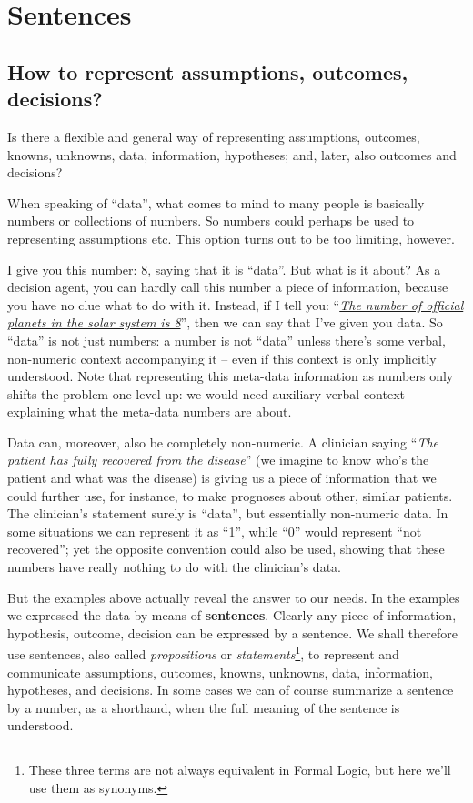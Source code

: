 \documentclass[
  a4paper,
  DIV=11,
  numbers=noendperiod,
  oneside]{scrreprt}
\begin{document}
\hypertarget{sentences}{%
\section{Sentences}\label{sentences}}

\hypertarget{how-to-represent-assumptions-outcomes-decisions}{%
\subsection{How to represent assumptions, outcomes,
decisions?}\label{how-to-represent-assumptions-outcomes-decisions}}

Is there a flexible and general way of representing assumptions,
outcomes, knowns, unknowns, data, information, hypotheses; and, later,
also outcomes and decisions?

When speaking of ``data'', what comes to mind to many people is
basically numbers or collections of numbers. So numbers could perhaps be
used to representing assumptions etc. This option turns out to be too
limiting, however.

I give you this number: {\(8\),} saying that it is ``data''. But what is
it about? As a decision agent, you can hardly call this number a piece
of information, because you have no clue what to do with it. Instead, if
I tell you:
``\emph{\href{https://solarsystem.nasa.gov/planets/overview}{The number
of official planets in the solar system is 8}}'', then we can say that
I've given you data. So ``data'' is not just numbers: a number is not
``data'' unless there's some verbal, non-numeric context accompanying it
-- even if this context is only implicitly understood. Note that
representing this meta-data information as numbers only shifts the
problem one level up: we would need auxiliary verbal context explaining
what the meta-data numbers are about.

Data can, moreover, also be completely non-numeric. A clinician saying
``\emph{The patient has fully recovered from the disease}'' (we imagine
to know who's the patient and what was the disease) is giving us a piece
of information that we could further use, for instance, to make
prognoses about other, similar patients. The clinician's statement
surely is ``data'', but essentially non-numeric data. In some situations
we can represent it as ``1'', while ``0'' would represent ``not
recovered''; yet the opposite convention could also be used, showing
that these numbers have really nothing to do with the clinician's data.

But the examples above actually reveal the answer to our needs. In the
examples we expressed the data by means of {\textbf{sentences}}. Clearly
any piece of information, hypothesis, outcome, decision can be expressed
by a sentence. We shall therefore use sentences, also called
\emph{propositions} or \emph{statements}\footnote{These three terms are
  not always equivalent in Formal Logic, but here we'll use them as
  synonyms.}, to represent and communicate assumptions, outcomes,
knowns, unknowns, data, information, hypotheses, and decisions. In some
cases we can of course summarize a sentence by a number, as a shorthand,
when the full meaning of the sentence is understood.
\end{document}
